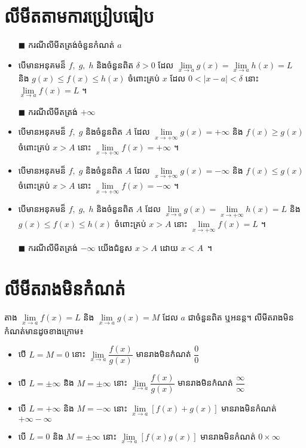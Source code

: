\documentclass[a5paper,leqno,fleqn]{book}
\begin{document}
\section{លីមីតតាមការប្រៀបធៀប}
\begin{generality}{}{}
	\begin{itemize}
	\item[\ensuremath{\blacksquare}] ករណីលីមីតត្រង់ចំនួនកំណត់ $ a $
	\item បើមានអនុគមន៏ $ f,\; g,\; h $ និងចំនួនពិត $ \delta>0 $ ដែល $ \lim\limits_{x\to a}g(x)=\lim\limits_{x\to a}h(x)=L $ និង $ g(x)\leq f(x)\leq h(x) $ ចំពោះគ្រប់ $ x $ ដែល $ 0<|x-a|<\delta $ នោះ $ \lim\limits_{x\to a}f(x)=L $ ។
	\item[\ensuremath{\blacksquare}] ករណីលីមីតត្រង់ $ +\infty $
	\item បើមានអនុគមន៏ $ f,\; g $ និងចំនួនពិត $ A $ ដែល $ \lim\limits_{x\to+\infty}g(x)=+\infty $ និង $ f(x)\geq g(x)$ ចំពោះគ្រប់ $ x>A $ នោះ $ \lim\limits_{x\to+\infty}f(x)=+\infty $ ។
	\item បើមានអនុគមន៏ $ f,\; g $ និងចំនួនពិត $ A $ ដែល $ \lim\limits_{x\to+\infty}g(x)=-\infty $ និង $ f(x)\leq g(x)$ ចំពោះគ្រប់ $ x>A $ នោះ $ \lim\limits_{x\to+\infty}f(x)=-\infty $ ។
	\item បើមានអនុគមន៏ $ f,\; g,\; h $ និងចំនួនពិត $ A $ ដែល $ \lim\limits_{x\to a}g(x)=\lim\limits_{x\to+\infty}h(x)=L $ និង $ g(x)\leq f(x)\leq h(x) $ ចំពោះគ្រប់ $ x>A $ នោះ $ \lim\limits_{x\to+\infty}f(x)=L $ ។
	\item[\ensuremath{\blacksquare}] ករណីលីមីតត្រង់ $ -\infty $ យើងជំនួស $ x>A $ ដោយ $ x<A $~។
	\end{itemize}
\end{generality}
\section{លីមីតរាងមិនកំណត់}
\begin{generality}{}{}
	តាង $ \lim\limits_{x\to a}f(x)=L $ និង $ \lim\limits_{x\to a}g(x)=M $ ដែល $ a $ ជាចំនួនពិត ឬអនន្ត។ លីមីតរាងមិនកំណត់មានដូចខាងក្រោម៖
	\begin{itemize}
		\item បើ $ L=M=0 $ នោះ $ \lim\limits_{x\to a}\dfrac{f(x)}{g(x)} $ មានរាងមិនកំណត់ $ \dfrac00 $
		\item បើ $ L=\pm\infty $ និង $ M=\pm\infty $ នោះ $ \lim\limits_{x\to a}\dfrac{f(x)}{g(x)} $ មានរាងមិនកំណត់ $ \dfrac{\infty}{\infty} $
		\item បើ $ L=+\infty $ និង $ M=-\infty $ នោះ $ \lim\limits_{x\to a}[f(x)+g(x)] $ មានរាងមិនកំណត់ $ +\infty-\infty $
		\item បើ $ L=0 $ និង $ M=\pm\infty $ នោះ $ \lim\limits_{x\to a}[f(x)g(x)] $ មានរាងមិនកំណត់ $ 0\times\infty $
	\end{itemize}
\end{generality}
\end{document}
